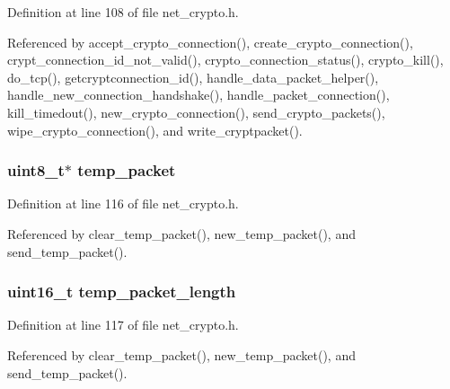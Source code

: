 Definition at line 108 of file net\+\_\+crypto.\+h.



Referenced by accept\+\_\+crypto\+\_\+connection(), create\+\_\+crypto\+\_\+connection(), crypt\+\_\+connection\+\_\+id\+\_\+not\+\_\+valid(), crypto\+\_\+connection\+\_\+status(), crypto\+\_\+kill(), do\+\_\+tcp(), getcryptconnection\+\_\+id(), handle\+\_\+data\+\_\+packet\+\_\+helper(), handle\+\_\+new\+\_\+connection\+\_\+handshake(), handle\+\_\+packet\+\_\+connection(), kill\+\_\+timedout(), new\+\_\+crypto\+\_\+connection(), send\+\_\+crypto\+\_\+packets(), wipe\+\_\+crypto\+\_\+connection(), and write\+\_\+cryptpacket().

\hypertarget{struct_crypto___connection_a360adb14f743065d5c69fe29a00a06a7}{
\subsubsection[{temp\+\_\+packet}]{\setlength{\rightskip}{0pt plus 5cm}uint8\+\_\+t$\ast$ temp\+\_\+packet}}\label{struct_crypto___connection_a360adb14f743065d5c69fe29a00a06a7}


Definition at line 116 of file net\+\_\+crypto.\+h.



Referenced by clear\+\_\+temp\+\_\+packet(), new\+\_\+temp\+\_\+packet(), and send\+\_\+temp\+\_\+packet().

\hypertarget{struct_crypto___connection_a4ef842580c6c073f36578d0e07551cc4}{
\subsubsection[{temp\+\_\+packet\+\_\+length}]{\setlength{\rightskip}{0pt plus 5cm}uint16\+\_\+t temp\+\_\+packet\+\_\+length}}\label{struct_crypto___connection_a4ef842580c6c073f36578d0e07551cc4}


Definition at line 117 of file net\+\_\+crypto.\+h.



Referenced by clear\+\_\+temp\+\_\+packet(), new\+\_\+temp\+\_\+packet(), and send\+\_\+temp\+\_\+packet().

